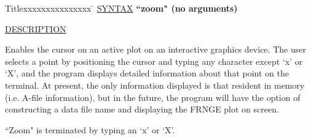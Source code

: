 \begin{tabbing}
Titlexxxxxxxxxxxxxxx \= \kill
\underline{SYNTAX} \> {\bf 		``zoom" (no arguments)} \\
\end{tabbing}

\underline{DESCRIPTION}
\begin{list}{}{\setlength{\leftmargin}{0.5in}
     \setlength{\rightmargin}{0in}}
\item
Enables the cursor on an active plot on an interactive
graphics device.  The user selects a point by positioning
the cursor and typing any character except `x' or `X', and 
the program displays detailed information about that point 
on the terminal.  At present, the only information displayed 
is that resident in memory (i.e. A-file information), but in 
the future, the program will have the option of constructing
a data file name and displaying the FRNGE plot on screen.
\item
``Zoom" is terminated by typing an `x' or `X'.
\end{list}
\vspace{.2in}

